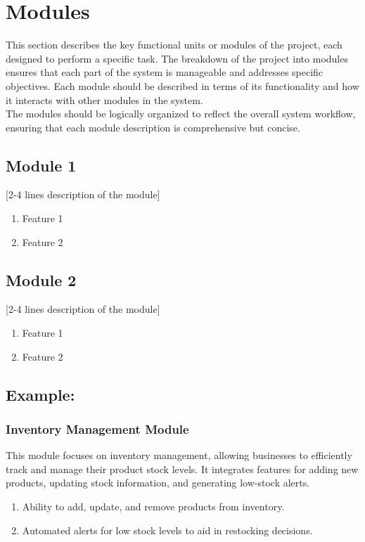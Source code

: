 \section{Modules}
This section describes the key functional units or modules of the project, each designed to perform a specific task. The breakdown of the project into modules ensures that each part of the system is manageable and addresses specific objectives. Each module should be described in terms of its functionality and how it interacts with other modules in the system. \\

The modules should be logically organized to reflect the overall system workflow, ensuring that each module description is comprehensive but concise.

\subsection{Module 1}
[2-4 lines description of the module]
\begin{enumerate}
    \item Feature 1
    \item Feature 2
\end{enumerate}

\subsection{Module 2}
[2-4 lines description of the module]
\begin{enumerate}
    \item Feature 1
    \item Feature 2
\end{enumerate}

\subsection{Example:}
\subsubsection{Inventory Management Module}
This module focuses on inventory management, allowing businesses to efficiently track and manage their product stock levels. It integrates features for adding new products, updating stock information, and generating low-stock alerts.

\begin{enumerate}
    \item Ability to add, update, and remove products from inventory.
    \item Automated alerts for low stock levels to aid in restocking decisions.
\end{enumerate}

